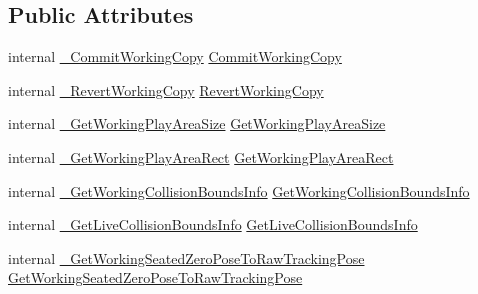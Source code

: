 \subsection*{Public Attributes}
\begin{DoxyCompactItemize}
\item 
internal \mbox{\hyperlink{struct_valve_1_1_v_r_1_1_i_v_r_chaperone_setup_ac4530ff8627eb38c16abc251b5f81249}{\+\_\+\+Commit\+Working\+Copy}} \mbox{\hyperlink{struct_valve_1_1_v_r_1_1_i_v_r_chaperone_setup_abdc250e82826f26eeef2e1248eb7e467}{Commit\+Working\+Copy}}
\item 
internal \mbox{\hyperlink{struct_valve_1_1_v_r_1_1_i_v_r_chaperone_setup_a236b48bec2b3c4a19ff1ea4853cc42a2}{\+\_\+\+Revert\+Working\+Copy}} \mbox{\hyperlink{struct_valve_1_1_v_r_1_1_i_v_r_chaperone_setup_aa7e495e7a7c2463c1ecf7a059bcee63d}{Revert\+Working\+Copy}}
\item 
internal \mbox{\hyperlink{struct_valve_1_1_v_r_1_1_i_v_r_chaperone_setup_ae1ab92ef98c104266da4a83086d96eb9}{\+\_\+\+Get\+Working\+Play\+Area\+Size}} \mbox{\hyperlink{struct_valve_1_1_v_r_1_1_i_v_r_chaperone_setup_a409ee11418455928f991e533d1d8de1e}{Get\+Working\+Play\+Area\+Size}}
\item 
internal \mbox{\hyperlink{struct_valve_1_1_v_r_1_1_i_v_r_chaperone_setup_a9d45f0e7a33aec365ddc6836942a453a}{\+\_\+\+Get\+Working\+Play\+Area\+Rect}} \mbox{\hyperlink{struct_valve_1_1_v_r_1_1_i_v_r_chaperone_setup_a6323a8d2b10431f219ab51ddc6a3c683}{Get\+Working\+Play\+Area\+Rect}}
\item 
internal \mbox{\hyperlink{struct_valve_1_1_v_r_1_1_i_v_r_chaperone_setup_ad1822f8ee3c4421e27175ae83ca0c7d9}{\+\_\+\+Get\+Working\+Collision\+Bounds\+Info}} \mbox{\hyperlink{struct_valve_1_1_v_r_1_1_i_v_r_chaperone_setup_aa9d181aa9ae28db9b6d05c55e3f2066b}{Get\+Working\+Collision\+Bounds\+Info}}
\item 
internal \mbox{\hyperlink{struct_valve_1_1_v_r_1_1_i_v_r_chaperone_setup_a1f35059b49dd3cdeee5e782176b0d086}{\+\_\+\+Get\+Live\+Collision\+Bounds\+Info}} \mbox{\hyperlink{struct_valve_1_1_v_r_1_1_i_v_r_chaperone_setup_a1e133b26b9ecf5d102924085710b4e0b}{Get\+Live\+Collision\+Bounds\+Info}}
\item 
internal \mbox{\hyperlink{struct_valve_1_1_v_r_1_1_i_v_r_chaperone_setup_af9e02f945345cc16c02e09a55ae07afa}{\+\_\+\+Get\+Working\+Seated\+Zero\+Pose\+To\+Raw\+Tracking\+Pose}} \mbox{\hyperlink{struct_valve_1_1_v_r_1_1_i_v_r_chaperone_setup_adc45a7b5f4004b45df3a25d15cb354f5}{Get\+Working\+Seated\+Zero\+Pose\+To\+Raw\+Tracking\+Pose}}
\item 

\end{DoxyCompactItemize}
